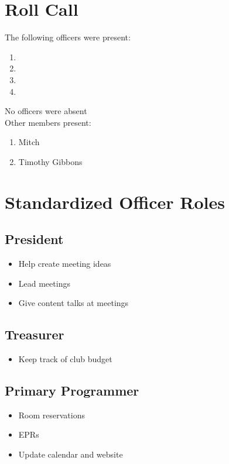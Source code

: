 \maketitle

\tableofcontents
\section{Roll Call}

The following officers were present:

\begin{enumerate}
    \item \president
    \item \tresurer
    \item \primaryprogrammer
    \item \secretary
\end{enumerate}

No officers were absent
\\
Other members present:
\begin{enumerate}
    \item Mitch
    \item Timothy Gibbons
\end{enumerate}

\section{Standardized Officer Roles}
    \subsection{President}
        \begin{itemize}
            \item Help create meeting ideas
            \item Lead meetings
            \item Give content talks at meetings
        \end{itemize}
    \subsection{Treasurer}
        \begin{itemize}
            \item Keep track of club budget
        \end{itemize}
    \subsection{Primary Programmer}
        \begin{itemize}
            \item Room reservations
            \item EPRs
            \item Update calendar and website
        \end{itemize}
